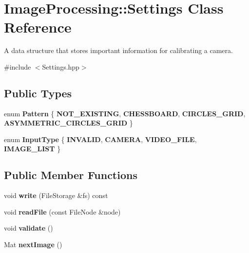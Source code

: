 \hypertarget{class_image_processing_1_1_settings}{}\section{Image\+Processing\+:\+:Settings Class Reference}
\label{class_image_processing_1_1_settings}


A data structure that stores important information for calibrating a camera.  




{\ttfamily \#include $<$Settings.\+hpp$>$}

\subsection*{Public Types}
\begin{DoxyCompactItemize}
\item 
\mbox{\label{class_image_processing_1_1_settings_aeffea40ead0e3443e0927daf900fc172}} 
enum {\bfseries Pattern} \{ {\bfseries N\+O\+T\+\_\+\+E\+X\+I\+S\+T\+I\+NG}, 
{\bfseries C\+H\+E\+S\+S\+B\+O\+A\+RD}, 
{\bfseries C\+I\+R\+C\+L\+E\+S\+\_\+\+G\+R\+ID}, 
{\bfseries A\+S\+Y\+M\+M\+E\+T\+R\+I\+C\+\_\+\+C\+I\+R\+C\+L\+E\+S\+\_\+\+G\+R\+ID}
 \}
\item 
\mbox{\label{class_image_processing_1_1_settings_ae6844d76686856698ebea9c09d62ecdb}} 
enum {\bfseries Input\+Type} \{ {\bfseries I\+N\+V\+A\+L\+ID}, 
{\bfseries C\+A\+M\+E\+RA}, 
{\bfseries V\+I\+D\+E\+O\+\_\+\+F\+I\+LE}, 
{\bfseries I\+M\+A\+G\+E\+\_\+\+L\+I\+ST}
 \}
\end{DoxyCompactItemize}
\subsection*{Public Member Functions}
\begin{DoxyCompactItemize}
\item 
\mbox{\label{class_image_processing_1_1_settings_a7d5a7bf8c716718f5ec670c8835b0138}} 
void {\bfseries write} (File\+Storage \&fs) const
\item 
\mbox{\label{class_image_processing_1_1_settings_a277e9672d7d34cd5ab2615a75d084471}} 
void {\bfseries read\+File} (const File\+Node \&node)
\item 
\mbox{\label{class_image_processing_1_1_settings_a0bf9b68388092c76621e24e2a65463eb}} 
void {\bfseries validate} ()
\item 
\mbox{\label{class_image_processing_1_1_settings_a62a6a119ead25cab4db6f41fcfa74080}} 
Mat {\bfseries next\+Image} ()
\end{DoxyCompactItemize}

